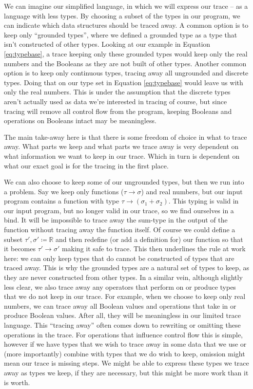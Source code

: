     We can imagine our simplified language, in which we will express our trace -- as a language with less types.
    By choosing a subset of the types in our program, we can indicate which data structures should be traced away.
    A common option is to keep only ``grounded types'', where we defined a grounded type as a type that isn't constructed of other types.
    Looking at our example in Equation \ref{eq:typebase}, a trace keeping only these grounded types would keep only the real numbers and the Booleans as they are not built of other types.
    Another common option is to keep only continuous types, tracing away all ungrounded and discrete types.
    Doing that on our type set in Equation \ref{eq:typebase} would leave us with only the real numbers.
    This is under the assumption that the discrete types aren't actually used as data we're interested in tracing of course, but since tracing will remove all control flow from the program, keeping Booleans and operations on Booleans intact may be meaningless. 

    The main take-away here is that there is some freedom of choice in what to trace away.
    What parts we keep and what parts we trace away is very dependent on what information we want to keep in our trace.
    Which in turn is dependent on what our exact goal is for the tracing in the first place.
    
    We can also choose to keep some of our ungrounded types, but then we run into a problem.
    Say we keep only functions ($\tau\to\sigma$) and real numbers, but our input program contains a function with type $\tau\to(\sigma_1+\sigma_2)$.
    This typing is valid in our input program, but no longer valid in our trace, so we find ourselves in a bind.
    It will be impossible to trace away the sum-type in the output of the function without tracing away the function itself.
    Of course we could define a subset $\tau',\sigma'\coloneqq\mathbb{R}$ and then redefine (or add a definition for) our function so that it becomes $\tau'\to\sigma'$ making it safe to trace.
    This then underlines the rule at work here: we can only keep types that do cannot be constructed of types that are traced away.
    This is why the grounded types are a natural set of types to keep, as they are never constructed from other types.
    In a similar vein, although slightly less clear, we also trace away any operators that perform on or produce types that we do not keep in our trace.
    For example, when we choose to keep only real numbers, we can trace away all Boolean values and operations that take in or produce Boolean values.
    After all, they will be meaningless in our limited trace language.
    This ``tracing away'' often comes down to rewriting or omitting these operations in the trace.
    For operations that influence control flow this is simple, however if we have types that we wish to trace away in some data that we use or (more importantly) combine with types that we do wish to keep, omission might mean our trace is missing steps.
    We might be able to express these types we trace away as types we keep, if they are necessary, but this might be more work than it is worth.


